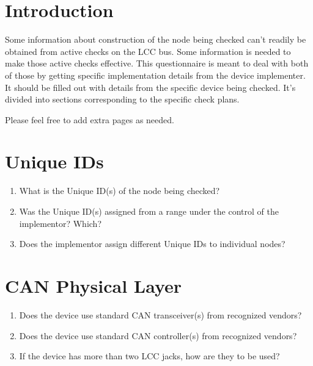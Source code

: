 



\maketitle
\thispagestyle{firststyle}

\section{Introduction}

Some information about construction of the node being checked can't readily be obtained
from active checks on the LCC bus. Some information is needed to make those active 
checks effective.  This questionnaire is meant to deal with both of those
by getting specific implementation details from the device implementer.
It should be filled out with details from the specific device being checked.
It's divided into sections corresponding to the specific check plans.

Please feel free to add extra pages as needed.

\section{Unique IDs}
\begin{enumerate}
    \item What is the Unique ID(s) of the node being checked?
    \item Was the Unique ID(s) assigned from a range under the control of the implementor? Which?
    \item Does the implementor assign different Unique IDs to individual nodes?
\end{enumerate}

\section{CAN Physical Layer}
\begin{enumerate}
    \item Does the device use standard CAN transceiver(s) from recognized vendors?
    \item Does the device use standard CAN controller(s) from recognized vendors?
    \item If the device has more than two LCC jacks, how are they to be used?
\end{enumerate}

